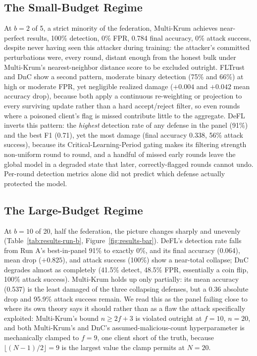 \documentclass[conference,9pt]{IEEEtran}
\begin{document}
\subsection{The Small-Budget Regime}
At $b{=}2$ of 5, a strict minority of the federation, Multi-Krum achieves near-perfect results, 100\% detection, 0\% FPR, 0.784 final accuracy, 0\% attack success, despite never having seen this attacker during training: the attacker's committed perturbations were, every round, distant enough from the honest bulk under Multi-Krum's nearest-neighbor distance score to be excluded outright. FLTrust and DnC show a second pattern, moderate binary detection (75\% and 66\%) at high or moderate FPR, yet negligible realized damage ($+0.004$ and $+0.042$ mean accuracy drop), because both apply a continuous re-weighting or projection to every surviving update rather than a hard accept/reject filter, so even rounds where a poisoned client's flag is missed contribute little to the aggregate. DeFL inverts this pattern: the \emph{highest} detection rate of any defense in the panel (91\%) and the best F1 (0.71), yet the most damage (final accuracy 0.338, 56\% attack success), because its Critical-Learning-Period gating makes its filtering strength non-uniform round to round, and a handful of missed early rounds leave the global model in a degraded state that later, correctly-flagged rounds cannot undo. Per-round detection metrics alone did not predict which defense actually protected the model.

\subsection{The Large-Budget Regime}
At $b{=}10$ of 20, half the federation, the picture changes sharply and unevenly (Table~\ref{tab:results-run-b}, Figure~\ref{fig:results-bar}). DeFL's detection rate falls from Run A's best-in-panel 91\% to exactly 0\%, and its final accuracy (0.064), mean drop ($+0.825$), and attack success (100\%) show a near-total collapse; DnC degrades almost as completely (41.5\% detect, 48.5\% FPR, essentially a coin flip, 100\% attack success). Multi-Krum holds up only partially: its mean accuracy (0.537) is the least damaged of the three collapsing defenses, but a 0.36 absolute drop and 95.9\% attack success remain. We read this as the panel failing close to where its own theory says it should rather than as a flaw the attack specifically exploited: Multi-Krum's bound $n \geq 2f+3$ is violated outright at $f=10$, $n=20$, and both Multi-Krum's and DnC's assumed-malicious-count hyperparameter is mechanically clamped to $f=9$, one client short of the truth, because $\lfloor (N-1)/2\rfloor=9$ is the largest value the clamp permits at $N=20$.
\end{document}
